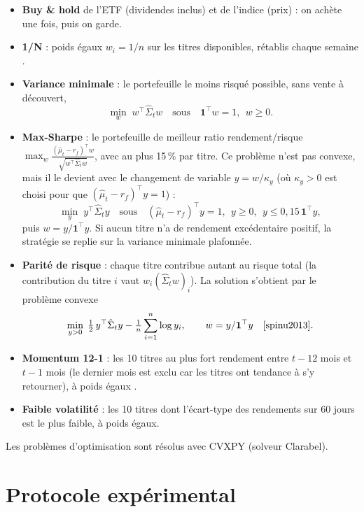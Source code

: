 \documentclass[11pt,a4paper]{article}
\begin{document}
\begin{itemize}
  \item \textbf{Buy \& hold} de l'ETF (dividendes inclus) et de l'indice (prix) : on achète une fois, puis on garde.
  \item \textbf{1/N} : poids égaux \(w_i=1/n\) sur les titres disponibles, rétablis chaque semaine \cite{demiguel2009}.
  \item \textbf{Variance minimale} : le portefeuille le moins risqué possible, sans vente à découvert,
        \[\min_{w}\; w^\top\hat\Sigma_t w\quad\text{sous}\quad \mathbf 1^\top w=1,\ \ w\ge0.\]
  \item \textbf{Max-Sharpe} : le portefeuille de meilleur ratio rendement/risque
        \(\max_w\frac{(\hat\mu_t-r_f)^\top w}{\sqrt{w^\top\hat\Sigma_t w}}\), avec au plus 15\,\% par titre. Ce
        problème n'est pas convexe, mais il le devient avec le changement de variable \(y=w/\kappa_y\) (où
        \(\kappa_y>0\) est choisi pour que \((\hat\mu_t-r_f)^\top y=1\)) :
        \[\min_{y}\; y^\top\hat\Sigma_t y\quad\text{sous}\quad(\hat\mu_t-r_f)^\top y=1,\ \ y\ge0,\ \ y\le0{,}15\,\mathbf 1^\top y,\]
        puis \(w=y/\mathbf 1^\top y\). Si aucun titre n'a de rendement excédentaire positif, la stratégie se replie
        sur la variance minimale plafonnée.
  \item \textbf{Parité de risque} : chaque titre contribue autant au risque total (la contribution du titre
        \(i\) vaut \(w_i(\hat\Sigma_t w)_i\)). La solution s'obtient par le problème convexe
        \[\min_{y>0}\;\tfrac12\,y^\top\hat\Sigma_t y-\tfrac1n\sum_{i=1}^n\log y_i,\qquad w=y/\mathbf 1^\top y\quad\text{\cite{spinu2013}}.\]
  \item \textbf{Momentum 12-1} : les 10 titres au plus fort rendement entre \(t-12\) mois et \(t-1\) mois (le
        dernier mois est exclu car les titres ont tendance à s'y retourner), à poids égaux \cite{jegadeesh1993}.
  \item \textbf{Faible volatilité} : les 10 titres dont l'écart-type des rendements sur 60 jours est le plus
        faible, à poids égaux.
\end{itemize}
Les problèmes d'optimisation sont résolus avec CVXPY \cite{cvxpy} (solveur Clarabel).

\section{Protocole expérimental}
\end{document}

